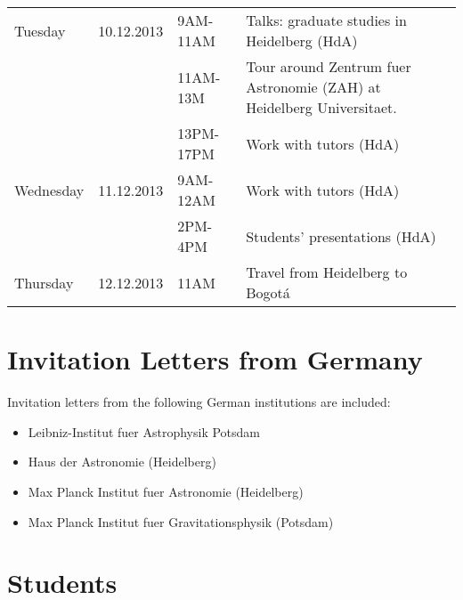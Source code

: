 \documentclass[12pt]{article}
\begin{document}
\begin{tabular}{p{2cm}p{2cm}p{2.5cm}p{7.0cm}}
Tuesday &10.12.2013  & 9AM-11AM & Talks: graduate studies in Heidelberg (HdA)\\
& & 11AM-13M & Tour around Zentrum fuer Astronomie (ZAH) at Heidelberg Universitaet.\\
 & & 13PM-17PM & Work with tutors (HdA)\\\hline

Wednesday &11.12.2013 & 9AM-12AM	&Work with tutors (HdA)\\
& & 2PM-4PM  & Students' presentations (HdA)\\\hline

Thursday &12.12.2013&11AM	& Travel from Heidelberg to Bogot\'a\\\hline\hline
\end{tabular}



\section{Invitation Letters from Germany}
Invitation letters from the following German institutions are included:

\begin{itemize}
\item Leibniz-Institut fuer Astrophysik Potsdam
\item Haus der Astronomie (Heidelberg)
\item Max Planck Institut fuer Astronomie (Heidelberg)
\item Max Planck Institut fuer Gravitationsphysik (Potsdam)
\end{itemize}


\section{Students }
\end{document}
